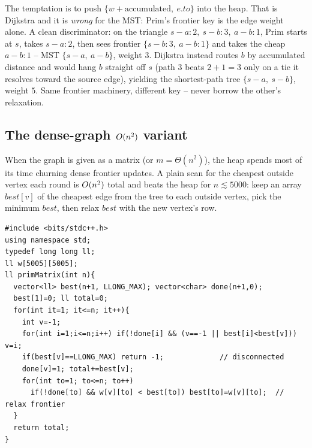 \begin{warningbox}
The temptation is to push \(\{w + \mathrm{accumulated},\ e.to\}\) into the heap.
That is Dijkstra and it is \emph{wrong} for the MST: Prim's frontier key is the
edge weight alone.  A clean discriminator: on the triangle \(s\!-\!a{:}2,\ s\!-\!b{:}3,\ a\!-\!b{:}1\),
Prim starts at \(s\), takes \(s\!-\!a{:}2\), then sees frontier \(\{s\!-\!b{:}3,\ a\!-\!b{:}1\}\)
and takes the cheap \(a\!-\!b{:}1\) -- MST \(\{s\!-\!a,\ a\!-\!b\}\), weight \(3\).
Dijkstra instead routes \(b\) by accumulated distance and would hang \(b\) straight
off \(s\) (path \(3\) beats \(2+1=3\) only on a tie it resolves toward the source
edge), yielding the shortest-path tree \(\{s\!-\!a,\ s\!-\!b\}\), weight \(5\).  Same
frontier machinery, different key -- never borrow the other's relaxation.
\end{warningbox}

\subsection{The dense-graph \texorpdfstring{\(O(n^2)\)}{O(n^2)} variant}

When the graph is given as a matrix (or \(m=\Theta(n^2)\)), the heap spends most
of its time churning dense frontier updates.  A plain scan for the cheapest
outside vertex each round is \(O(n^2)\) total and beats the heap for
\(n\lesssim 5000\): keep an array \(\mathit{best}[v]\) of the cheapest edge from
the tree to each outside vertex, pick the minimum \(\mathit{best}\), then relax
\(\mathit{best}\) with the new vertex's row.

\begin{lstlisting}[caption={Matrix Prim, O(n squared). The best array holds the cheapest tree-to-vertex edge weight; pick the minimum over outside vertices, then relax it with the newly added row. Ideal for dense graphs or an explicit weight matrix}, label={lst:c17-prim-matrix}]
#include <bits/stdc++.h>
using namespace std;
typedef long long ll;
ll w[5005][5005];
ll primMatrix(int n){
  vector<ll> best(n+1, LLONG_MAX); vector<char> done(n+1,0);
  best[1]=0; ll total=0;
  for(int it=1; it<=n; it++){
    int v=-1;
    for(int i=1;i<=n;i++) if(!done[i] && (v==-1 || best[i]<best[v])) v=i;
    if(best[v]==LLONG_MAX) return -1;             // disconnected
    done[v]=1; total+=best[v];
    for(int to=1; to<=n; to++)
      if(!done[to] && w[v][to] < best[to]) best[to]=w[v][to];  // relax frontier
  }
  return total;
}
\end{lstlisting}

